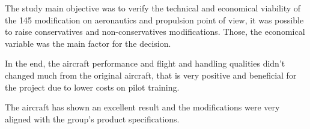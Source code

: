 ﻿%
The study main objective was to verify the technical and economical viability of the 145 modification on aeronautics and propulsion point of view, it was possible to raise conservatives and non-conservatives modifications. Those, the economical variable was the main factor for the decision.

In the end, the aircraft performance and flight and handling qualities didn't changed much from the original aircraft, that is very positive and beneficial for the project due to lower costs on pilot training.

The aircraft has shown an excellent result and the modifications were very aligned with the group's product specifications. 
